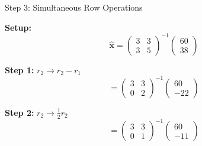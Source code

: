 \documentclass[10pt]{beamer}
\theoremstyle{definition}
\begin{document}
\begin{frame}{Step 3: Simultaneous Row Operations}

\textbf{Setup:}
$$\hat{\mathbf{x}} = \begin{pmatrix} 3 & 3 \\ 3 & 5 \end{pmatrix}^{-1}\begin{pmatrix} 60 \\ 38 \end{pmatrix}$$

\vspace{0.3em}

\textbf{Step 1:} $r_2 \to r_2 - r_1$
$$= \begin{pmatrix} 3 & 3 \\ 0 & 2 \end{pmatrix}^{-1}\begin{pmatrix} 60 \\ -22 \end{pmatrix}$$

\textbf{Step 2:} $r_2 \to \frac{1}{2}r_2$
$$= \begin{pmatrix} 3 & 3 \\ 0 & 1 \end{pmatrix}^{-1}\begin{pmatrix} 60 \\ -11 \end{pmatrix}$$

\end{frame}
\end{document}
